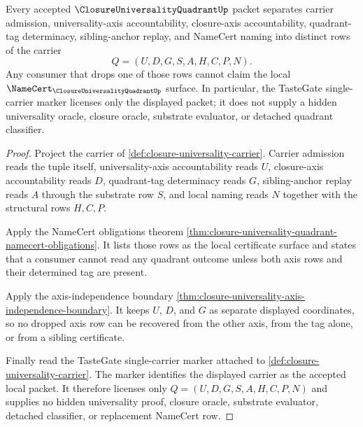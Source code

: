 \begin{theorem}
\label{thm:closure-universality-quadrant-obligation-separation}
Every accepted $\ClosureUniversalityQuadrantUp$ packet separates carrier admission, universality-axis accountability, closure-axis accountability, quadrant-tag determinacy, sibling-anchor replay, and NameCert naming into distinct rows of the carrier
$$
Q=(U,D,G,S,A,H,C,P,N).
$$
Any consumer that drops one of those rows cannot claim the local $\NameCert_{\ClosureUniversalityQuadrantUp}$ surface. In particular, the TasteGate single-carrier marker licenses only the displayed packet; it does not supply a hidden universality oracle, closure oracle, substrate evaluator, or detached quadrant classifier.
\end{theorem}
\begin{proof}
Project the carrier of \autoref{def:closure-universality-carrier}. Carrier admission reads the tuple itself, universality-axis accountability reads $U$, closure-axis accountability reads $D$, quadrant-tag determinacy reads $G$, sibling-anchor replay reads $A$ through the substrate row $S$, and local naming reads $N$ together with the structural rows $H,C,P$.

Apply the NameCert obligations theorem \autoref{thm:closure-universality-quadrant-namecert-obligations}. It lists those rows as the local certificate surface and states that a consumer cannot read any quadrant outcome unless both axis rows and their determined tag are present.

Apply the axis-independence boundary \autoref{thm:closure-universality-axis-independence-boundary}. It keeps $U$, $D$, and $G$ as separate displayed coordinates, so no dropped axis row can be recovered from the other axis, from the tag alone, or from a sibling certificate.

Finally read the TasteGate single-carrier marker attached to \autoref{def:closure-universality-carrier}. The marker identifies the displayed carrier as the accepted local packet. It therefore licenses only $Q=(U,D,G,S,A,H,C,P,N)$ and supplies no hidden universality proof, closure oracle, substrate evaluator, detached classifier, or replacement NameCert row.
\end{proof}

